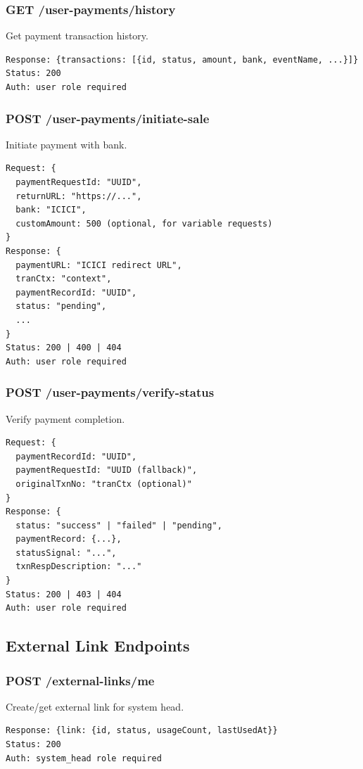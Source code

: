 \documentclass[12pt,a4paper]{article}
\begin{document}
\subsubsection{GET /user-payments/history}
Get payment transaction history.
\begin{lstlisting}
Response: {transactions: [{id, status, amount, bank, eventName, ...}]}
Status: 200
Auth: user role required
\end{lstlisting}

\subsubsection{POST /user-payments/initiate-sale}
Initiate payment with bank.
\begin{lstlisting}
Request: {
  paymentRequestId: "UUID",
  returnURL: "https://...",
  bank: "ICICI",
  customAmount: 500 (optional, for variable requests)
}
Response: {
  paymentURL: "ICICI redirect URL",
  tranCtx: "context",
  paymentRecordId: "UUID",
  status: "pending",
  ...
}
Status: 200 | 400 | 404
Auth: user role required
\end{lstlisting}

\subsubsection{POST /user-payments/verify-status}
Verify payment completion.
\begin{lstlisting}
Request: {
  paymentRecordId: "UUID",
  paymentRequestId: "UUID (fallback)",
  originalTxnNo: "tranCtx (optional)"
}
Response: {
  status: "success" | "failed" | "pending",
  paymentRecord: {...},
  statusSignal: "...",
  txnRespDescription: "..."
}
Status: 200 | 403 | 404
Auth: user role required
\end{lstlisting}

\subsection{External Link Endpoints}

\subsubsection{POST /external-links/me}
Create/get external link for system head.
\begin{lstlisting}
Response: {link: {id, status, usageCount, lastUsedAt}}
Status: 200
Auth: system_head role required
\end{lstlisting}
\end{document}
